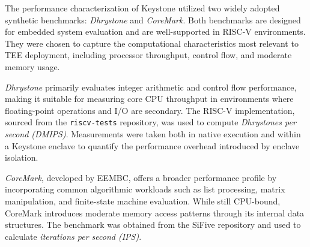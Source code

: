 The performance characterization of Keystone utilized two widely adopted synthetic benchmarks: \textit{Dhrystone} and \textit{CoreMark}. Both benchmarks are designed for embedded system evaluation and are well-supported in RISC-V environments. They were chosen to capture the computational characteristics most relevant to TEE deployment, including processor throughput, control flow, and moderate memory usage.

\textit{Dhrystone} primarily evaluates integer arithmetic and control flow performance, making it suitable for measuring core CPU throughput in environments where floating-point operations and I/O are secondary. The RISC-V implementation, sourced from the \texttt{riscv-tests} repository, was used to compute \textit{Dhrystones per second (DMIPS)}. Measurements were taken both in native execution and within a Keystone enclave to quantify the performance overhead introduced by enclave isolation.

\textit{CoreMark}, developed by EEMBC, offers a broader performance profile by incorporating common algorithmic workloads such as list processing, matrix manipulation, and finite-state machine evaluation. While still CPU-bound, CoreMark introduces moderate memory access patterns through its internal data structures. The benchmark was obtained from the SiFive repository and used to calculate \textit{iterations per second (IPS)}.

